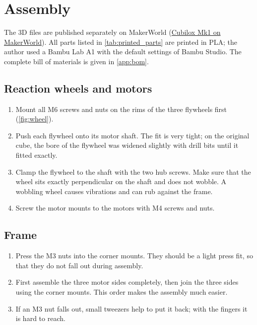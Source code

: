 \chapter{Assembly}
\label{ch:assembly}

The 3D files are published separately on MakerWorld (\href{https://makerworld.com/de/models/3406349-cubilox-mk1-self-balancing-cube-on-its-corner\#profileId-3879241}{Cubilox Mk1 on MakerWorld}). All parts
listed in \cref{tab:printed_parts} are printed in PLA; the author used a Bambu Lab A1 with the
default settings of Bambu Studio. The complete bill of materials is given in \cref{app:bom}.

\section{Reaction wheels and motors}

\begin{enumerate}
  \item Mount all M6 screws and nuts on the rims of the three flywheels first
        (\cref{fig:wheel}).
  \item Push each flywheel onto its motor shaft. The fit is very tight; on the original cube, the
        bore of the flywheel was widened slightly with drill bits until it fitted exactly.
  \item Clamp the flywheel to the shaft with the two hub screws. Make sure that the wheel sits
        exactly perpendicular on the shaft and does not wobble. A wobbling wheel causes
        vibrations and can rub against the frame.
  \item Screw the motor mounts to the motors with M4 screws and nuts.
\end{enumerate}

\section{Frame}

\begin{enumerate}
  \item Press the M3 nuts into the corner mounts. They should be a light press fit, so that they
        do not fall out during assembly.
  \item First assemble the three motor sides completely, then join the three sides using the
        corner mounts. This order makes the assembly much easier.
  \item If an M3 nut falls out, small tweezers help to put it back; with the fingers it is hard to
        reach.
\end{enumerate}

